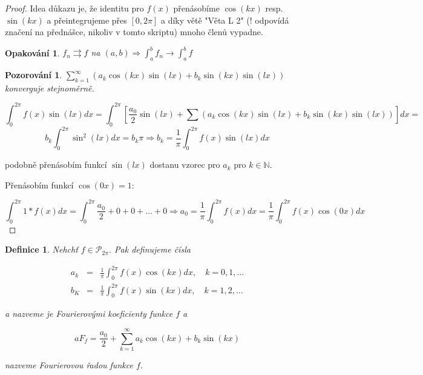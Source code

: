 \documentclass[11pt,a4paper]{article}
\newtheorem*{definice}{Definice}
\newtheorem*{opakovani}{Opakování}
\newtheorem*{pozorovani}{Pozorování}
\newcommand{\con}{\rightrightarrows}
\begin{document}
\begin{proof}
Idea důkazu je, že identitu pro $f(x)$ přenásobíme $\cos(kx)$ resp. $\sin(kx)$  a přeintegrujeme přes $[0, 2 \pi]$ a díky větě "Věta L 2" (! odpovídá značení na přednášce, nikoliv v tomto skriptu) mnoho členů vypadne.

\begin{opakovani}
$f_n \con f$ na $(a,b) \Rightarrow \int_a^b f_n \rightarrow \int_a^b f$
\end{opakovani}

\begin{pozorovani}
$\sum_{k=1}^{\infty} \left( a_k \cos(kx) \sin(lx) + b_k \sin(kx) \sin(lx) \right)$ konverguje stejnoměrně.
\end{pozorovani}

$$\int_{0}^{2 \pi} f(x) \sin(lx) dx = \int_{0}^{2 \pi} \left[ \frac{a_0}{2} \sin(lx) + \sum \left( a_k \cos(kx) \sin(lx) + b_k \sin(kx) \sin(lx) \right) \right] dx = $$
$$b_k \int_{0}^{2 \pi} \sin^2(lx) dx = b_k \pi \Rightarrow b_k = \frac{1}{\pi} \int_0^{2 \pi} f(x) \sin(lx) dx$$

podobně přenásobím funkcí $\sin(lx)$ dostanu vzorec pro $a_k$ pro $k \in \mathbb{N}$.

Přenásobím funkcí $\cos(0x) = 1$:

$$\int_{0}^{2 \pi} 1 * f(x) dx = \int_{0}^{2 \pi} \frac{a_0}{2}+0+0+\ldots+0 \Rightarrow a_0 = \frac{1}{\pi} \int_{0}^{2 \pi} f(x) dx = \frac{1}{\pi} \int_0^{2 \pi} f(x) \cos(0x) dx$$

\end{proof}

\begin{definice}
Nehchť $f \in \mathcal{P}_{2 \pi}$. Pak definujeme čísla

\begin{eqnarray}
a_k & = & \frac{1}{\pi} \int_{0}^{2 \pi} f(x) \cos(kx) dx, \quad k=0,1,\ldots \nonumber\\
b_K & = & \frac{1}{\pi} \int_{0}^{2 \pi} f(x) \sin(kx) dx, \quad k=1,2,\ldots \nonumber
\end{eqnarray}

a nazveme je \emph{Fourierovými koeficienty} funkce $f$ a 

$$a F_f = \frac{a_0}{2} + \sum_{k=1}^\infty a_k \cos(kx) + b_k \sin(kx)$$

nazveme Fourierovou řadou funkce $f$.
\end{definice}
\end{document}
